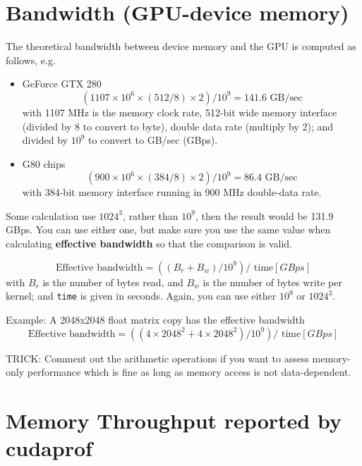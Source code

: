 \section{Bandwidth (GPU-device memory)}
\label{sec:bandwidth}

The theoretical bandwidth between device memory and the GPU is
computed as follows, e.g. 
\begin{itemize}
\item GeForce GTX 280
  \begin{equation*}
    (1107 \times 10^6 \times (512/8) \times 2 ) / 10^9 = 141.6 \text{ GB/sec}
  \end{equation*}
  with 1107 MHz is the memory clock rate, 512-bit wide memory interface
  (divided by 8 to convert to byte), double data rate (multiply by 2);
  and divided by $10^9$ to convert to GB/sec (GBps). 

\item G80 chips
  \begin{equation*}
    (900 \times 10^6 \times (384/8) \times 2) / 10^9 = 86.4 \text{ GB/sec}
  \end{equation*}
  with 384-bit memory interface running in 900 MHz double-data rate.
\end{itemize}


Some calculation use $1024^3$, rather than $10^9$, then the result
would be 131.9 GBps. You can use either one, but make sure you use the
same value when calculating {\bf effective bandwidth} so that the
comparison is valid. 

\begin{equation*}
  \text{Effective bandwidth} = ((B_r + B_w)/10^9) / \text{ time}  [GBps]
\end{equation*}
with $B_r$ is the number of bytes read, and $B_w$ is the number of
bytes write per kernel; and \verb!time! is given in seconds. Again,
you can use either $10^9$ or $1024^3$.

Example: A 2048x2048 float matrix copy has the effective bandwidth
\begin{equation*}
  \text{Effective bandwidth} = ((4\times 2048^2 + 4\times 2048^2)/10^9) / \text{ time}  [GBps]
\end{equation*}

TRICK: Comment out the arithmetic operations if you want to assess
memory-only performance which is fine as long as memory access is not
data-dependent.


\section{Memory Throughput reported by cudaprof}
\label{sec:thro-report-cudapr}

